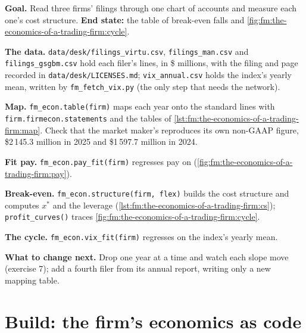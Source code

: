 \begin{tutorial}
\textbf{Goal.} Read three firms' filings through one chart of accounts and measure each one's cost structure. \textbf{End state:} the table of
break-even falls and \cref{fig:fm:the-economics-of-a-trading-firm:cycle}.
\begin{tutsteps}
\item \textbf{The data.} \texttt{data/desk/filings\_virtu.csv}, \texttt{filings\_man.csv} and \texttt{filings\_gsgbm.csv} hold each filer's lines,
in \$ millions, with the filing and page recorded in \texttt{data/desk/LICENSES.md}; \texttt{vix\_annual.csv} holds the index's yearly mean,
written by \texttt{fm\_fetch\_vix.py} (the only step that needs the network).
\item \textbf{Map.} \texttt{fm\_econ.table(firm)} maps each year onto the standard lines with \texttt{firm.firmecon.statements} and the tables of
\cref{lst:fm:the-economics-of-a-trading-firm:map}. Check that the market maker's  reproduces its own non-GAAP figure,
\$2\,145.3 million in 2025 and \$1\,597.7 million in 2024.
\item \textbf{Fit pay.} \texttt{fm\_econ.pay\_fit(firm)} regresses pay on  (\cref{fig:fm:the-economics-of-a-trading-firm:pay}).
\item \textbf{Break-even.} \texttt{fm\_econ.structure(firm, flex)} builds the cost structure and computes $x^\ast$ and the leverage
(\cref{lst:fm:the-economics-of-a-trading-firm:cs}); \texttt{profit\_curves()} traces \cref{fig:fm:the-economics-of-a-trading-firm:cycle}.
\label{lst:fm:the-economics-of-a-trading-firm:cs}
\item \textbf{The cycle.} \texttt{fm\_econ.vix\_fit(firm)} regresses  on the index's yearly mean.
\end{tutsteps}
\end{tutorial}

\textbf{What to change next.} Drop one year at a time and watch each slope move (exercise 7); add a fourth filer from its annual report, writing
only a new mapping table.

\section{Build: the firm's economics as code}\label{bld:fm:the-economics-of-a-trading-firm:firmecon}

